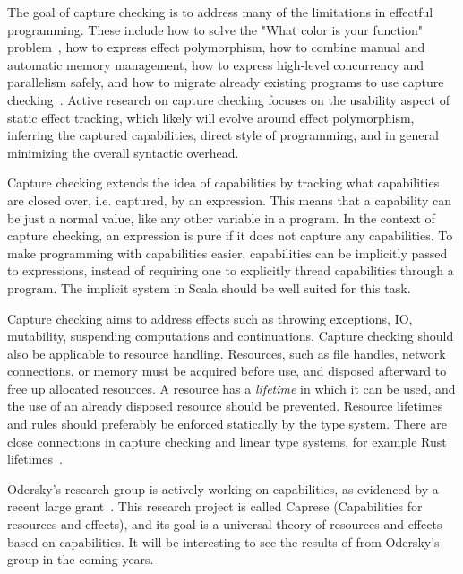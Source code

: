 The goal of capture checking is to address many of the limitations in effectful programming. These include how to solve the "What color is your function" problem~\cite{what-color-is-your-function}, how to express effect polymorphism, how to combine manual and automatic memory management, how to express high-level concurrency and parallelism safely, and how to migrate already existing programs to use capture checking~\cite{odersky-twitter-caprese}. Active research on capture checking focuses on the usability aspect of static effect tracking, which likely will evolve around effect polymorphism, inferring the captured capabilities, direct style of programming, and in general minimizing the overall syntactic overhead.

Capture checking extends the idea of capabilities by tracking what capabilities are closed over, i.e. captured, by an expression. This means that a capability can be just a normal value, like any other variable in a program. In the context of capture checking, an expression is pure if it does not capture any capabilities. To make programming with capabilities easier, capabilities can be implicitly passed to expressions, instead of requiring one to explicitly thread capabilities through a program. The implicit system in Scala should be well suited for this task.

Capture checking aims to address effects such as throwing exceptions, IO, mutability, suspending computations and continuations. Capture checking should also be applicable to resource handling. Resources, such as file handles, network connections, or memory must be acquired before use, and disposed afterward to free up allocated resources. A resource has a \emph{lifetime} in which it can be used, and the use of an already disposed resource should be prevented. Resource lifetimes and rules should preferably be enforced statically by the type system. There are close connections in capture checking and linear type systems, for example Rust lifetimes~\cite{rust-lifetimes}.

Odersky's research group is actively working on capabilities, as evidenced by a recent large grant~\cite{capture-checking-grant}. This research project is called Caprese (Capabilities for resources and effects), and its goal is a universal theory of resources and effects based on capabilities. It will be interesting to see the results of from Odersky's group in the coming years.
